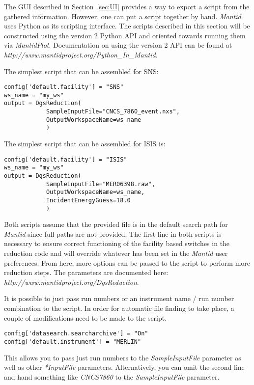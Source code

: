 The GUI described in Section~\ref{sec:UI} provides a way to export a script from the gathered information. However, one can put a script together by hand. \textit{Mantid} uses Python as its scripting interface. The scripts described in this section will be constructed using the version 2 Python API and oriented towards running them via \textit{MantidPlot}. Documentation on using the version 2 API can be found at \textit{http://www.mantidproject.org/Python\_In\_Mantid}.

The simplest script that can be assembled for SNS:
\begin{verbatim}
config['default.facility'] = "SNS"
ws_name = "my_ws"
output = DgsReduction(
            SampleInputFile="CNCS_7860_event.nxs",
            OutputWorkspaceName=ws_name
            )
\end{verbatim}
The simplest script that can be assembled for ISIS is:
\begin{verbatim}
config['default.facility'] = "ISIS"
ws_name = "my_ws"
output = DgsReduction(
            SampleInputFile="MER06398.raw",
            OutputWorkspaceName=ws_name,
            IncidentEnergyGuess=18.0
            )
\end{verbatim}
Both scripts assume that the provided file is in the default search path for \textit{Mantid} since full paths are not provided. The first line in both scripts is necessary to ensure correct functioning of the facility based switches in the reduction code and will override whatever has been set in the \textit{Mantid} user preferences. From here, more options can be passed to the script to perform more reduction steps. The parameters are documented here: \textit{http://www.mantidproject.org/DgsReduction}.

It is possible to just pass run numbers or an instrument name / run number combination to the script. In order for automatic file finding to take place, a couple of modifications need to be made to the script. 
\begin{verbatim}
config['datasearch.searcharchive'] = "On"
config['default.instrument'] = "MERLIN"
\end{verbatim}
This allows you to pass just run numbers to the \textit{SampleInputFile} parameter as well as other \textit{*InputFile} parameters. Alternatively, you can omit the second line and hand something like \textit{CNCS7860} to the \textit{SampleInputFile} parameter.

